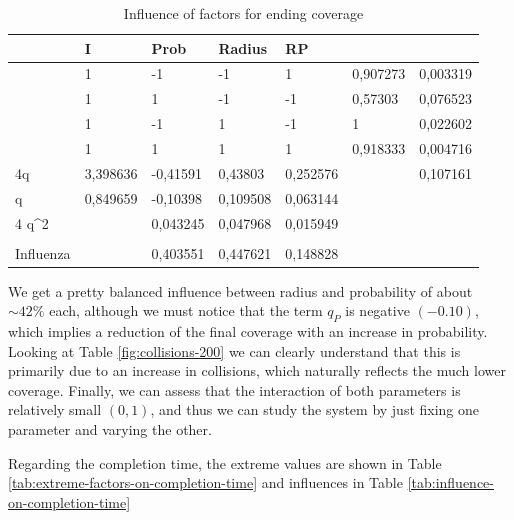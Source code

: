 \begin{table}[H]
\centering
\begin{tabular}{|l|l|l|l|l|l|l|}
\hline
                       & I        & Prob     & Radius   & RP       &          &          \\ \hline
                       & 1        & -1       & -1       & 1        & 0,907273 & 0,003319 \\ \hline
                       & 1        & 1        & -1       & -1       & 0,57303  & 0,076523 \\ \hline
                       & 1        & -1       & 1        & -1       & 1        & 0,022602 \\ \hline
                       & 1        & 1        & 1        & 1        & 0,918333 & 0,004716 \\ \hline
4q                     & 3,398636 & -0,41591 & 0,43803  & 0,252576 &          & 0,107161 \\ \hline
q                      & 0,849659 & -0,10398 & 0,109508 & 0,063144 &          &          \\ \hline
4 q\textasciicircum{}2 &          & 0,043245 & 0,047968 & 0,015949 &          &          \\ \hline
                       &          &          &          &          &          &          \\ \hline
Influenza              &          & 0,403551 & 0,447621 & 0,148828 &          &          \\ \hline
\end{tabular}
\caption{Influence of factors for ending coverage}
\label{tab:influence-on-end-coverage}
\end{table}

We get a pretty balanced influence between radius and probability of about $\sim 42\%$ each, although we must notice that the term $q_P$ is negative $(-0.10)$, which implies a reduction of the final coverage with an increase in probability. Looking at Table \ref{fig:collisions-200} we can clearly understand that this is primarily due to an increase in collisions, which naturally reflects the much lower coverage. Finally, we can assess that the interaction of both parameters is relatively small $(0,1)$, and thus we can study the system by just fixing one parameter and varying the other.

Regarding the completion time, the extreme values are shown in Table \ref{tab:extreme-factors-on-completion-time} and influences in Table \ref{tab:influence-on-completion-time}

